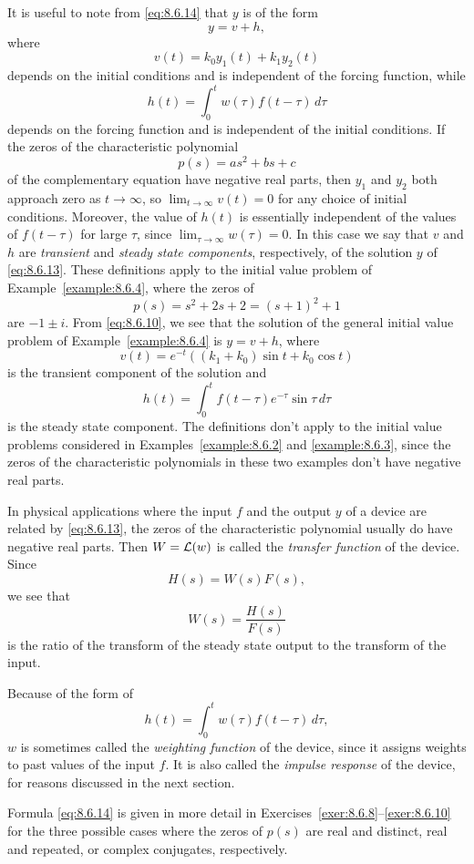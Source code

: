 It is useful to note from \eqref{eq:8.6.14} that $y$ is of the form
\[
  y=v+h,
\]
where
\[
  v(t)=k_{0}y_{1}(t)+k_{1}y_{2}(t)
\]
depends on the initial conditions and is independent of the forcing function, while
\[
  h(t)=\int_{0}^{t}w(\tau)f(t-\tau)\, d\tau
\]
depends on the forcing function and is independent of the initial conditions. If the zeros of the
characteristic polynomial
\[
  p(s)=as^{2}+bs+c
\]
of the complementary equation have negative real parts, then $y_{1}$ and $y_{2}$ both approach zero
as $t\to\infty$, so $\lim_{t\to\infty}v(t)=0$ for any choice of initial conditions. Moreover, the
value of $h(t)$ is essentially independent of the values of $f(t-\tau)$ for large $\tau$, since
$\lim_{\tau\to\infty}w(\tau)=0$. In this case we say that $v$ and $h$ are {\color{blue}\it
transient\/} and {\color{blue}\it steady state components\/}, respectively, of the solution $y$ of
\eqref{eq:8.6.13}. These definitions apply to the initial value problem of
Example~\ref{example:8.6.4}, where the zeros of
\[
  p(s)=s^{2}+2s+2=(s+1)^{2}+1
\]
are $-1\pm i$. From \eqref{eq:8.6.10}, we see that the solution of the general initial value problem
of Example~\ref{example:8.6.4} is $y=v+h$, where
\[
  v(t)=e^{-t}\left((k_{1}+k_{0})\sin t+k_{0}\cos t\right)
\]
is the transient component of the solution and
\[
  h(t)=\int_{0}^{t}f(t-\tau)e^{-\tau}\sin\tau\,d\tau
\]
is the steady state component. The definitions don't apply to the initial value problems considered
in Examples~\ref{example:8.6.2} and \ref{example:8.6.3}, since the zeros of the characteristic
polynomials in these two examples don't have negative real parts.

In physical applications where the input $f$ and the output $y$ of a device are related by
\eqref{eq:8.6.13}, the zeros of the characteristic polynomial usually do have negative real parts.
Then $W={\cal L}(w)$ is called the {\color{blue}\it transfer function\; } of the device. Since
\[
  H(s)=W(s)F(s),
\]
we see that
\[
  W(s)=\frac{H(s)}{F(s)}
\]
is the ratio of the transform of the steady state output to the transform of the input.

Because of the form of
\[
  h(t)=\int_{0}^{t}w(\tau)f(t-\tau)\,d\tau,
\]
$w$ is sometimes called the {\color{blue}\it weighting function} of the device, since it assigns
weights to past values of the input $f$. It is also called the {\color{blue}\it impulse response} of
the device, for reasons discussed in the next section.

Formula \eqref{eq:8.6.14} is given in more detail in Exercises~\ref{exer:8.6.8}--\ref{exer:8.6.10}
for the three possible cases where the zeros of $p(s)$ are real and distinct, real and repeated, or
complex conjugates, respectively.

